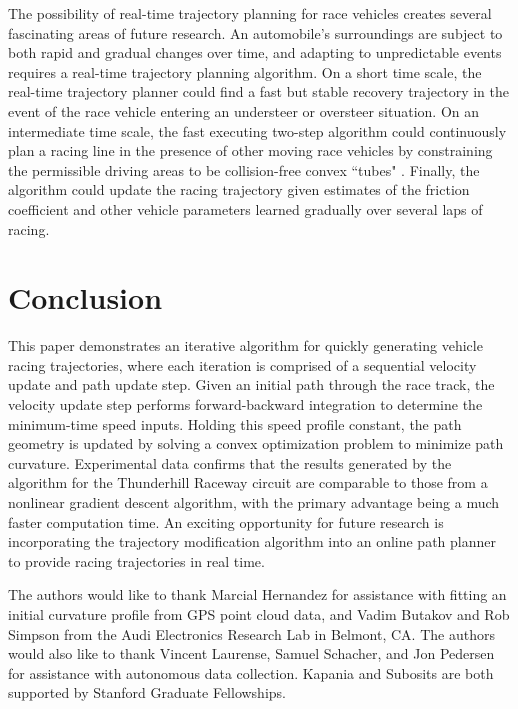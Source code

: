 \documentclass[twocolumn,10pt]{asme2ej}
\begin{document}
 The possibility of real-time trajectory planning for race vehicles creates several fascinating areas of future research. An automobile's surroundings are subject to both rapid and
 gradual changes over time, and adapting to unpredictable events requires a real-time trajectory planning algorithm.
 On a short time scale, the real-time trajectory planner could find a fast but stable recovery trajectory in the event of the race vehicle entering an understeer or oversteer 
 situation. On an intermediate time scale, the fast executing two-step algorithm could continuously plan a racing line in the presence of other moving race vehicles by constraining the
 permissible driving areas to be collision-free convex ``tubes" \cite{erlien}.  Finally, the algorithm could update the racing trajectory given estimates of the friction coefficient and other vehicle parameters learned gradually over
 several laps of racing.
 
\section{Conclusion}
This paper demonstrates an iterative algorithm for quickly generating vehicle racing trajectories, where each iteration is comprised of
 a sequential velocity update and path update step. Given an initial path through the race track, the 
 velocity update step performs forward-backward integration to determine the minimum-time speed inputs. Holding this speed 
 profile constant, the path geometry is updated by solving a convex optimization problem to minimize path curvature. Experimental data confirms that the results
 generated by the algorithm for the Thunderhill Raceway circuit are comparable to those from a nonlinear gradient descent algorithm, with the primary advantage being a much
 faster computation time. An exciting opportunity for future research is incorporating the trajectory modification algorithm into an online path planner to provide
 racing trajectories in real time. 
 

\begin{acknowledgment}
The authors would like to thank Marcial Hernandez for assistance with fitting an initial curvature profile from GPS point
cloud data, and Vadim Butakov and Rob Simpson from the Audi Electronics Research Lab in Belmont, CA. The authors would
also like to thank Vincent Laurense, Samuel Schacher, and Jon Pedersen for assistance with autonomous data collection.
Kapania and Subosits are both supported by Stanford Graduate Fellowships. 
\end{acknowledgment}



\end{document}
